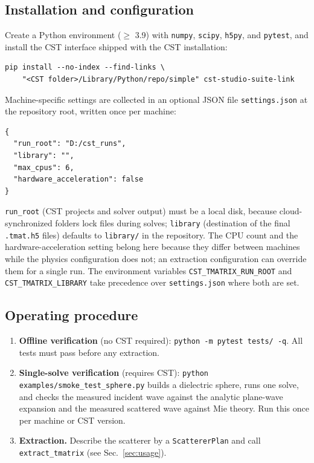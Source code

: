\documentclass[11pt]{article}
\begin{document}
\subsection{Installation and configuration}
\label{sec:install}
Create a Python environment ($\ge$ 3.9) with \texttt{numpy},
\texttt{scipy}, \texttt{h5py}, and \texttt{pytest}, and install the CST
interface shipped with the CST installation:
\begin{verbatim}
pip install --no-index --find-links \
    "<CST folder>/Library/Python/repo/simple" cst-studio-suite-link
\end{verbatim}
Machine-specific settings are collected in an optional JSON file
\texttt{settings.json} at the repository root, written once per
machine:
\begin{verbatim}
{
  "run_root": "D:/cst_runs",
  "library": "",
  "max_cpus": 6,
  "hardware_acceleration": false
}
\end{verbatim}
\texttt{run\_root} (CST projects and solver output) must be a local
disk, because cloud-synchronized folders lock files during solves;
\texttt{library} (destination of the final \texttt{.tmat.h5} files)
defaults to \texttt{library/} in the repository.  The CPU count and
the hardware-acceleration setting belong here because they differ
between machines while the physics configuration does not; an
extraction configuration can override them for a single run.  The
environment variables \texttt{CST\_TMATRIX\_RUN\_ROOT} and
\texttt{CST\_TMATRIX\_LIBRARY} take precedence over
\texttt{settings.json} where both are set.

\subsection{Operating procedure}
\begin{enumerate}
\item \textbf{Offline verification} (no CST required):
\texttt{python -m pytest tests/ -q}.  All tests must pass before any
extraction.
\item \textbf{Single-solve verification} (requires CST):
\texttt{python examples/smoke\_test\_sphere.py} builds a dielectric
sphere, runs one solve, and checks the measured incident wave against the
analytic plane-wave expansion and the measured scattered wave against Mie
theory.  Run this once per machine or CST version.
\item \textbf{Extraction.}  Describe the scatterer by a
\texttt{ScattererPlan} and call \texttt{extract\_tmatrix} (see
Sec.~\ref{sec:usage}).
\end{enumerate}
\end{document}
